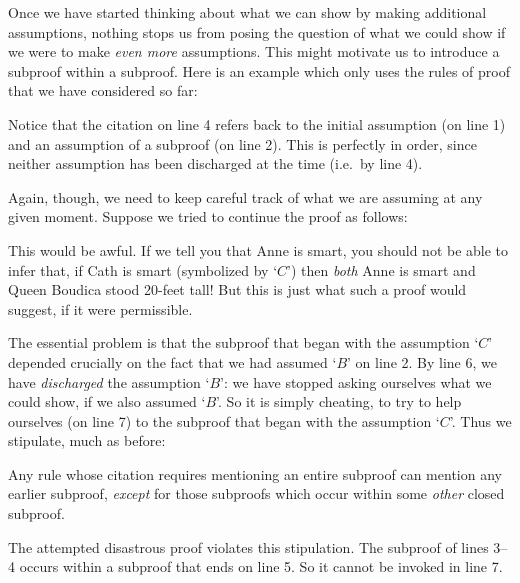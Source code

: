 Once we have started thinking about what we can show by making additional assumptions, nothing stops us from posing the question of what we could show if we were to make \emph{even more} assumptions. This might motivate us to introduce a subproof within a subproof. Here is an example which only uses the rules of proof that we have considered so far:
\begin{fitchproof}
	\open
	\open
	\close
	\close
\end{fitchproof}
Notice that the citation on line 4 refers back to the initial assumption (on line 1) and an assumption of a subproof (on line 2). This is perfectly in order, since neither assumption has been discharged at the time (i.e.\ by line 4).

Again, though, we need to keep careful track of what we are assuming at any given moment. Suppose we tried to continue the proof as follows:
\begin{fitchproof}
	\open
	\open
	\close
	\close
\end{fitchproof}
This would be awful. If we tell you that Anne is smart, you should not be able to infer that, if Cath is smart (symbolized by `$C$') then \emph{both} Anne is smart and Queen Boudica stood 20-feet tall! But this is just what such a proof would suggest, if it were permissible.

The essential problem is that the subproof that began with the assumption `$C$' depended crucially on the fact that we had assumed `$B$' on line 2. By line 6, we have \emph{discharged} the assumption `$B$': we have stopped asking ourselves what we could show, if we also assumed `$B$'. So it is simply cheating, to try to help ourselves (on line 7) to the subproof that began with the assumption `$C$'. Thus we stipulate, much as before:
\begin{highlighted}Any rule whose citation requires mentioning an entire subproof can mention any earlier subproof, \emph{except} for those subproofs which occur within some \emph{other} closed subproof.\end{highlighted}
The attempted disastrous proof violates this stipulation. The subproof of lines 3--4 occurs within a subproof that ends on line 5. So it cannot be invoked in line 7.

